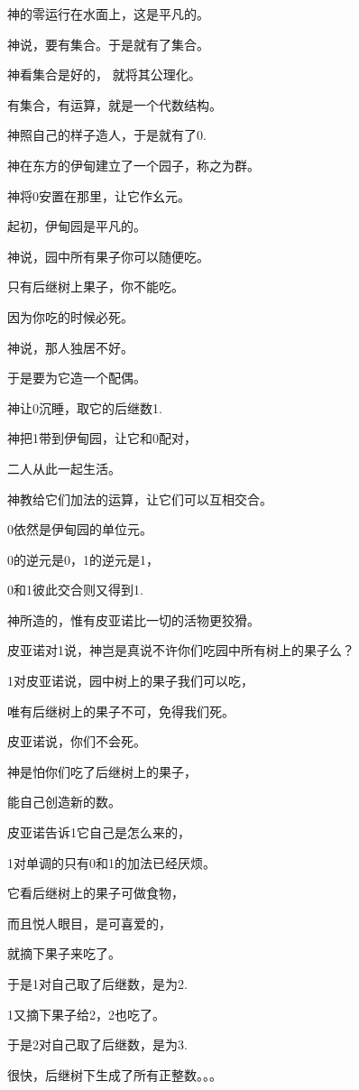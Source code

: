 神的零运行在水面上，这是平凡的。

神说，要有集合。于是就有了集合。

神看集合是好的， 就将其公理化。

有集合，有运算，就是一个代数结构。\vsp

神照自己的样子造人，于是就有了0.

神在东方的伊甸建立了一个园子，称之为群。

神将0安置在那里，让它作幺元。

起初，伊甸园是平凡的。

神说，园中所有果子你可以随便吃。

只有后继树上果子，你不能吃。

因为你吃的时候必死。\vsp

神说，那人独居不好。

于是要为它造一个配偶。

神让0沉睡，取它的后继数1.

神把1带到伊甸园，让它和0配对，

二人从此一起生活。

神教给它们加法的运算，让它们可以互相交合。

0依然是伊甸园的单位元。

0的逆元是0，1的逆元是1，

0和1彼此交合则又得到1.\vsp

神所造的，惟有皮亚诺比一切的活物更狡猾。

皮亚诺对1说，神岂是真说不许你们吃园中所有树上的果子么？

1对皮亚诺说，园中树上的果子我们可以吃，

唯有后继树上的果子不可，免得我们死。

皮亚诺说，你们不会死。

神是怕你们吃了后继树上的果子，

能自己创造新的数。\vsp

皮亚诺告诉1它自己是怎么来的，

1对单调的只有0和1的加法已经厌烦。

它看后继树上的果子可做食物，

而且悦人眼目，是可喜爱的，

就摘下果子来吃了。\vsp

于是1对自己取了后继数，是为2.

1又摘下果子给2，2也吃了。

于是2对自己取了后继数，是为3.

很快，后继树下生成了所有正整数。。。

